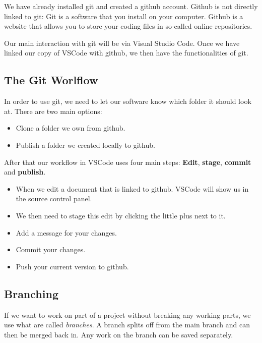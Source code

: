 \documentclass[11pt,a4paper]{report}
\begin{document}
We have already installed git and created a github account. Github is not directly linked to git: Git is a software that you install on your computer. Github is a website that allows you to store your coding files in so-called online repositories.

Our main interaction with git will be via Visual Studio Code. Once we have linked our copy of VSCode with github, we then have the functionalities of git.

\subsection{The Git Worlflow}
In order to use git, we need to let our software know which folder it should look at. There are two main options:
\begin{itemize}
\item Clone a folder we own from github.
\item Publish a folder we created locally to github.
\end{itemize}

\newpage

After that our workflow in VSCode uses four main steps: {\bf Edit}, {\bf stage}, {\bf commit} and {\bf publish}.
\begin{itemize}
\item When we edit a document that is linked to github. VSCode will show us in the source control panel.
\item We then need to stage this edit by clicking the little plus next to it.
\item Add a message for your changes.
\newpage
\item Commit your changes.
\item Push your current version to github.
\end{itemize}

\subsection{Branching}

If we want to work on part of a project without breaking any working parts, we use what are called \emph{branches}. A branch splits off from the main branch and can then be merged back in. Any work on the branch can be saved separately.

\newpage
\end{document}
